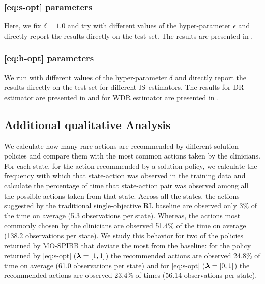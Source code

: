 \subsubsection{\ref{eq:s-opt} parameters}

Here, we fix $\delta=1.0$ and try with different values of the hyper-parameter $\epsilon$ and directly report the results directly on the test set. The results are presented in .


\subsubsection{\ref{eq:h-opt} parameters}


We run with different values of the hyper-parameter $\delta$ and directly report the results directly on the test set for different $\text{IS}$ estimators. The results for DR estimator are presented in  and for WDR estimator are presented in .






\subsection{Additional qualitative Analysis}
\label{app:sepsis-qual-analysis}
We calculate how many rare-actions are recommended by different solution policies and compare them with the most common actions taken by the clinicians.
For each state, for the action recommended by a solution policy, we calculate the frequency with which that state-action was observed in the training data and calculate the percentage of time that state-action pair was observed among all the possible actions taken from that state.
Across all the states, the actions suggested by the traditional single-objective RL baseline are observed only 3\% of the time on average (5.3 observations per state). Whereas, the actions most commonly chosen by the clinicians  are observed 51.4\% of the time on average (138.2 observations per state). We study this behavior for two of the policies returned by MO-SPIBB that deviate the most from the baseline: for the policy returned by \ref{eq:s-opt} ($\bm{\lambda}=[1,1]$) the recommended actions are observed 24.8\% of time on average (61.0 observations per state) and for  \ref{eq:s-opt} ($\bm{\lambda}=[0,1]$) the recommended actions are observed 23.4\% of times (56.14 observations per state).


